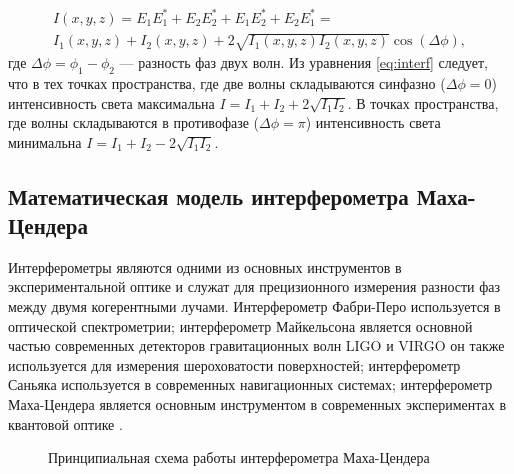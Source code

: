 \begin{multline}
    I(x, y, z) = E_1E_1^* + E_2E_2^* + E_1E_2^* + E_2E_1^* = \\
    I_1(x,y,z) + I_2(x,y,z) + 2 \sqrt{I_1(x,y,z)I_2(x,y,z)}\cos(\Delta \phi),
\label{eq:interf}
\end{multline}
где $\Delta \phi = \phi_1 - \phi_2$ --- разность фаз двух волн. Из уравнения \eqref{eq:interf} следует, что в тех точках пространства, где две волны складываются синфазно ($\Delta \phi = 0$) интенсивность света максимальна $I = I_1 + I_2 + 2\sqrt{I_1I_2}$. В точках пространства, где волны складываются в противофазе ($\Delta \phi = \pi$) интенсивность света минимальна $I = I_1 + I_2 - 2\sqrt{I_1I_2}$.

\subsection{Математическая модель интерферометра Маха-Цендера}\label{sec:ch2/sec1/subsec2}

Интерферометры являются одними из основных инструментов в экспериментальной оптике и служат для прецизионного измерения разности фаз между двумя когерентными лучами.  Интерферометр Фабри-Перо\cite{fabry-perot1899} используется в оптической спектрометрии; интерферометр Майкельсона является основной частью современных детекторов гравитационных волн LIGO и VIRGO \cite{LIGO, VIRGO} он также используется для измерения шероховатости поверхностей; интерферометр Саньяка используется в современных навигационных системах; интерферометр Маха-Цендера является основным инструментом в современных экспериментах в квантовой оптике \cite{Sarkar2006, Sychev2017}. 

\begin{figure}[ht]
\caption{Принципиальная схема работы интерферометра Маха-Цендера}
\label{fig:MZI}
\end{figure}

